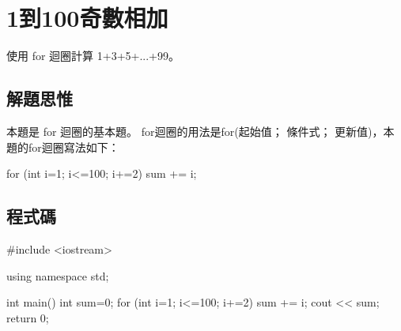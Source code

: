 \section{1到100奇數相加}
使用 for 迴圈計算 1+3+5+...+99。

\subsection{解題思惟}
本題是 for 迴圈的基本題。
for迴圈的用法是for(起始值； 條件式； 更新值)，本題的for迴圈寫法如下：
\begin{inside}
	for (int i=1; i<=100; i+=2) sum += i;
\end{inside}

\subsection{程式碼}
\begin{cppcode}
#include <iostream>

using namespace std;

int main()
{
	int sum=0;
	for (int i=1; i<=100; i+=2) sum += i;
	cout << sum;
	return 0;
}
\end{cppcode}
